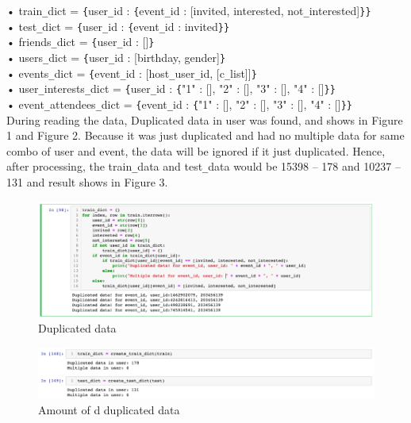 \documentclass{article}
\begin{document}
•	train\verb+_+dict = \verb+{+user\verb+_+id : \verb+{+event\verb+_+id : [invited, interested, not\verb+_+interested]\verb+}+\verb+}+\\
•	test\verb+_+dict = \verb+{+user\verb+_+id : \verb+{+event\verb+_+id : invited\verb+}+\verb+}+\\
•	friends\verb+_+dict = \verb+{+user\verb+_+id : []\verb+}+\\
•	users\verb+_+dict = \verb+{+user\verb+_+id : [birthday, gender]\verb+}+\\
•	events\verb+_+dict = \verb+{+event\verb+_+id : [host\verb+_+user\verb+_+id, [c\verb+_+list]]\verb+}+\\
•	user\verb+_+interests\verb+_+dict = \verb+{+user\verb+_+id : \verb+{+"1" : [], "2" : [], "3" : [], "4" : []\verb+}+\verb+}+\\
•	event\verb+_+attendees\verb+_+dict = \verb+{+event\verb+_+id : \verb+{+"1" : [], "2" : [], "3" : [], "4" : []\verb+}+\verb+}+\\

During reading the data, Duplicated data in user was found, and shows in Figure 1 and Figure 2. Because it was just duplicated and had no multiple data for same combo of user and event, the data will be ignored if it just duplicated. Hence, after processing, the train\verb+_+data and test\verb+_+data would be 15398 – 178 and 10237 – 131 and result shows in Figure 3.

\begin{figure}[h]
  \centering
  \includegraphics[width=1.0\textwidth]{img/Picture 2}
  \caption{Duplicated data}
\end{figure}

\begin{figure}[h]
  \centering
  \includegraphics[width=1.0\textwidth]{img/Picture 1}
  \caption{Amount of d duplicated data}
\end{figure}
\end{document}
